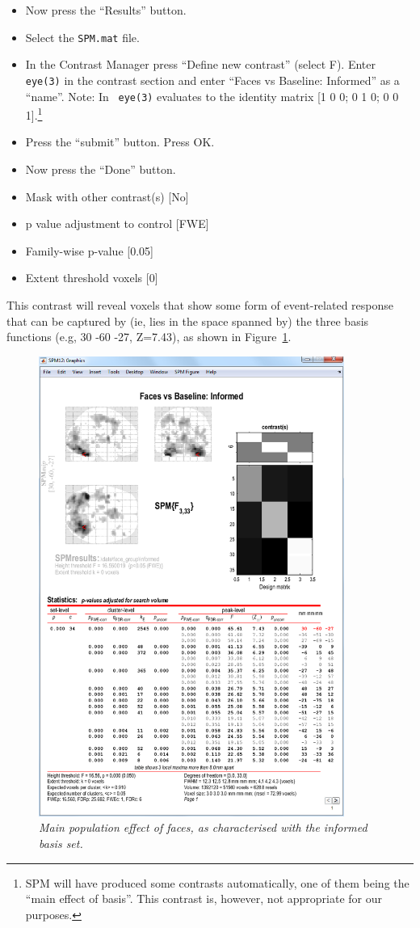 \begin{itemize}
\item Now press the ``Results'' button.
\item Select the \texttt{SPM.mat} file.
\item In the Contrast Manager press ``Define new contrast'' (select F). Enter \texttt{eye(3)} in the contrast section and enter ``Faces vs Baseline: Informed'' as a ``name''. Note: In \matlab\ \texttt{eye(3)} evaluates to the identity matrix [1 0 0; 0 1 0; 0 0 1].\footnote{SPM will have produced some contrasts automatically, one of them being the ``main effect of basis''. This contrast is, however, not appropriate for our purposes.}
\item Press the ``submit'' button. Press OK.
\item Now press the ``Done'' button.
\item Mask with other contrast(s) [No]
\item p value adjustment to control [FWE]
\item Family-wise p-value [0.05]
\item Extent threshold {voxels} [0]
\end{itemize}

This contrast will reveal voxels that show some form of event-related response that can be captured by (ie, lies in the space spanned by) the three basis functions (e.g, 30 -60 -27, Z=7.43), as shown in Figure~\ref{informed_results}.
\begin{figure}
\begin{center}
\includegraphics[width=100mm]{faces_group/informed_results}
\caption{\em Main population effect of faces, as characterised with the informed basis set. \label{informed_results}}
\end{center}
\end{figure}

